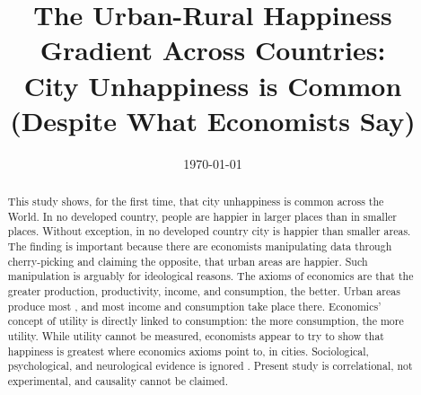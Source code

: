 \documentclass[10pt, letterpaper]{article}
\date{{}\today  \hspace{.2in}\xxivtime}
\title{  %
The Urban-Rural Happiness Gradient Across Countries:\\
City Unhappiness is Common \\ 
(Despite What Economists Say) %
}
\author{
}
\begin{document}


\maketitle
\vspace{-.4in}
\begin{center}

\end{center}


\begin{abstract}
This study shows, for the first time, that city unhappiness is 
common across the World.
%
In no developed country, people are happier in larger places than in
smaller places.
Without exception, in no developed country city is happier than smaller areas.
%
The finding is important because there are
 economists manipulating data through cherry-picking
\citep[e.g.,][]{glaeser11,glaeser14,burger20} and claiming the opposite, that
urban areas are happier. Such manipulation is arguably for ideological
reasons. The axioms of economics are that the greater production, productivity,
income, and consumption, the better. Urban areas produce most%
, and most income and consumption take place there.
Economics' concept of utility is directly linked to consumption: the more
consumption, the more utility. While utility cannot be measured, economists
appear to try to show that happiness is greatest where economics axioms point
to, in cities. Sociological, psychological, and neurological evidence is ignored
. Present study is
correlational, not experimental, and causality cannot be claimed. 
\end{abstract}
\vspace{.15in} 
\noindent{\sc %
}
\vspace{.25in} 
\end{document}
